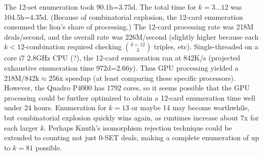 \documentclass[10pt]{amsart}
\begin{document}
The 12-set enumeration took 90.1h=3.75d. The total time for $k=3\ldots 12$ was
104.5h=4.35d. (Because of combinatorial explosion, the 12-card enumeration
consumed the lion's share of processing.) The 12-card processing rate was 218M
deals/second, and the overall rate was 226M/second (slightly higher because each
$k<12$-combination required checking $\binom{k<12}{3}$ triples,
etc). Single-threaded on a core i7 2.8GHz CPU (?), the 12-card enumeration ran
at 842K/s (projected exhaustive enumeration time 972d=2.66y). Thus GPU
processing yielded a 218M/842k$\approx$256x speedup (at least comparing these specific
processors). However, the Quadro P4000 has 1792 cores, so it seems possible that
the GPU processing could be further optimized to obtain a 12-card enumeration
time well under 24 hours. Enumeration for $k=13$ or maybe 14 may become
worthwhile, but combinatorial explosion quickly wins again, as runtimes increase
about 7x for each larger $k$. Perhaps Knuth's isomorphism rejection technique
could be extended to counting not just 0-SET deals, making a complete
enumeration of up to $k=81$ possible.
\end{document}
